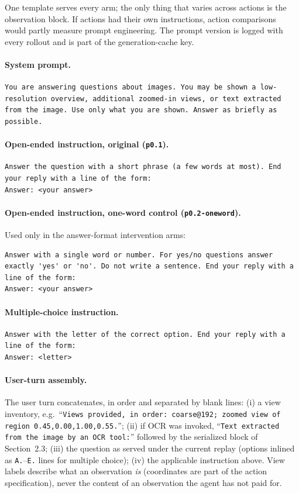 \documentclass[10pt]{article}
\begin{document}
One template serves every arm; the only thing that varies across actions is
the observation block. If actions had their own instructions, action
comparisons would partly measure prompt engineering. The prompt version is
logged with every rollout and is part of the generation-cache key.

\paragraph{System prompt.}
\begin{lstlisting}
You are answering questions about images. You may be shown a low-resolution overview, additional zoomed-in views, or text extracted from the image. Use only what you are shown. Answer as briefly as possible.
\end{lstlisting}

\paragraph{Open-ended instruction, original (\texttt{p0.1}).}
\begin{lstlisting}
Answer the question with a short phrase (a few words at most). End your reply with a line of the form:
Answer: <your answer>
\end{lstlisting}

\paragraph{Open-ended instruction, one-word control (\texttt{p0.2-oneword}).}
Used only in the answer-format intervention arms:
\begin{lstlisting}
Answer with a single word or number. For yes/no questions answer exactly 'yes' or 'no'. Do not write a sentence. End your reply with a line of the form:
Answer: <your answer>
\end{lstlisting}

\paragraph{Multiple-choice instruction.}
\begin{lstlisting}
Answer with the letter of the correct option. End your reply with a line of the form:
Answer: <letter>
\end{lstlisting}

\paragraph{User-turn assembly.}
The user turn concatenates, in order and separated by blank lines: (i) a
view inventory, e.g.\ ``\texttt{Views provided, in order: coarse@192;
zoomed view of region 0.45,0.00,1.00,0.55.}''; (ii) if OCR was invoked,
``\texttt{Text extracted from the image by an OCR tool:}'' followed by the
serialized block of Section~2.3; (iii) the question as served under the
current replay (options inlined as \texttt{A.}--\texttt{E.} lines for
multiple choice); (iv) the applicable instruction above. View labels
describe what an observation \emph{is} (coordinates are part of the action
specification), never the content of an observation the agent has not paid
for.
\end{document}
